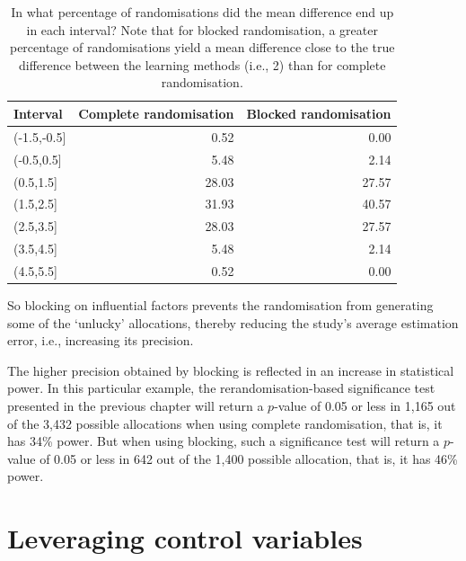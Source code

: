 \documentclass[a4paper]{tufte-book}\usepackage[]{graphicx}\usepackage[]{xcolor}
\begin{document}
\begin{table}[tpbh]

\caption{In what percentage of randomisations did the mean difference end up in each interval? Note that for blocked randomisation, a greater percentage of randomisations yield a mean difference close to the true difference between the learning methods (i.e., 2) than for complete randomisation.}
\label{tab:diffrand}
\centering
\begin{tabular}[t]{lrr}
\toprule
Interval & Complete randomisation & Blocked randomisation\\
\midrule
(-1.5,-0.5] & 0.52 & 0.00\\
(-0.5,0.5] & 5.48 & 2.14\\
(0.5,1.5] & 28.03 & 27.57\\
(1.5,2.5] & 31.93 & 40.57\\
(2.5,3.5] & 28.03 & 27.57\\
(3.5,4.5] & 5.48 & 2.14\\
(4.5,5.5] & 0.52 & 0.00\\
\bottomrule
\end{tabular}
\end{table}
%
So blocking on influential factors prevents
the randomisation from generating some of the `unlucky' allocations,
thereby reducing the study's average estimation error, i.e., increasing
its precision.

The higher precision obtained by blocking is reflected
in an increase in statistical power.
In this particular example, the rerandomisation-based
significance test presented in the previous chapter
will return a $p$-value of 0.05 or less in 1,165 out of the
3,432 possible allocations when using complete randomisation,
that is, it has 34\% power.
But when using blocking, such a significance test will return
a $p$-value of 0.05 or less in 642 out of the 1,400 possible
allocation, that is, it has 46\% power.


\section{Leveraging control variables}\label{sec:covariates}
\end{document}
